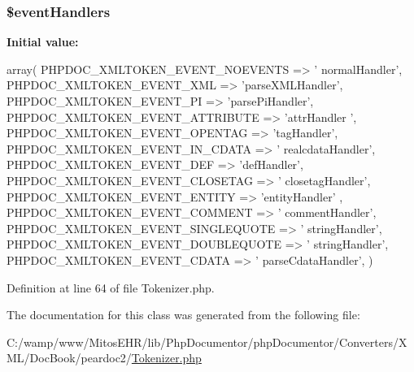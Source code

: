 \hypertarget{classphp_documentor___x_m_l___beautifier___tokenizer_a430675102684e9ab820c7622678832b0}{
\subsubsection[{\$event\-Handlers}]{\setlength{\rightskip}{0pt plus 5cm}\$event\-Handlers}}\label{classphp_documentor___x_m_l___beautifier___tokenizer_a430675102684e9ab820c7622678832b0}
{\bfseries \-Initial value\-:}
\begin{DoxyCode}
 array(
                                PHPDOC_XMLTOKEN_EVENT_NOEVENTS => '
      normalHandler',
                                PHPDOC_XMLTOKEN_EVENT_XML => 'parseXMLHandler',
                                PHPDOC_XMLTOKEN_EVENT_PI => 'parsePiHandler',
                                PHPDOC_XMLTOKEN_EVENT_ATTRIBUTE => 'attrHandler
      ',
                                PHPDOC_XMLTOKEN_EVENT_OPENTAG => 'tagHandler',
                                PHPDOC_XMLTOKEN_EVENT_IN_CDATA => '
      realcdataHandler',
                                PHPDOC_XMLTOKEN_EVENT_DEF => 'defHandler',
                                PHPDOC_XMLTOKEN_EVENT_CLOSETAG => '
      closetagHandler',
                                PHPDOC_XMLTOKEN_EVENT_ENTITY => 'entityHandler'
      ,
                                PHPDOC_XMLTOKEN_EVENT_COMMENT => '
      commentHandler',
                                PHPDOC_XMLTOKEN_EVENT_SINGLEQUOTE => '
      stringHandler',
                                PHPDOC_XMLTOKEN_EVENT_DOUBLEQUOTE => '
      stringHandler',
                                PHPDOC_XMLTOKEN_EVENT_CDATA => '
      parseCdataHandler',
    )
\end{DoxyCode}


\-Definition at line 64 of file \-Tokenizer.\-php.



\-The documentation for this class was generated from the following file\-:\begin{DoxyCompactItemize}
\item 
\-C\-:/wamp/www/\-Mitos\-E\-H\-R/lib/\-Php\-Documentor/php\-Documentor/\-Converters/\-X\-M\-L/\-Doc\-Book/peardoc2/\hyperlink{_tokenizer_8php}{\-Tokenizer.\-php}\end{DoxyCompactItemize}
